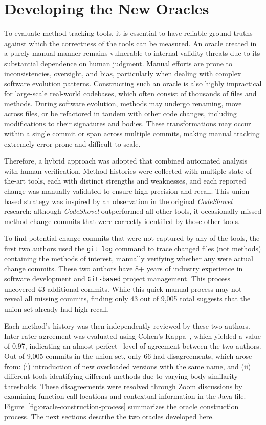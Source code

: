 \section{Developing the New Oracles}
\label{sec:developing-oracles}
To evaluate method-tracking tools, it is essential to have reliable ground truths against which the correctness of the tools can be measured. An oracle created in a purely manual manner remains vulnerable to internal validity threats due to its substantial dependence on human judgment. Manual efforts are prone to inconsistencies, oversight, and bias, particularly when dealing with complex software evolution patterns. Constructing such an oracle is also highly impractical for large-scale real-world codebases, which often consist of thousands of files and methods. During software evolution, methods may undergo renaming, move across files, or be refactored in tandem with other code changes, including modifications to their signatures and bodies. These transformations may occur within a single commit or span across multiple commits, making manual tracking extremely error-prone and difficult to scale.

Therefore, a hybrid approach was adopted that combined automated analysis with human verification. Method histories were collected with multiple state-of-the-art tools, each with distinct strengths and weaknesses, and each reported change was manually validated to ensure high precision and recall. This union-based strategy was inspired by an observation in the original \textit{CodeShovel} research: although \textit{CodeShovel} outperformed all other tools, it occasionally missed method change commits that were correctly identified by those other tools.

To find potential change commits that were not captured by any of the tools, the first two authors used the \texttt{git log} command to trace changed files (not methods) containing the methods of interest, manually verifying whether any were actual change commits.
These two authors have 8+ years of industry experience in software development and \texttt{Git-based} project management. This process uncovered 43 additional commits. While this quick manual process may not reveal all missing commits, finding only 43 out of 9,005 total suggests that the union set already had high recall.

Each method’s history was then independently reviewed by these two authors. Inter-rater agreement was evaluated using Cohen’s Kappa~\cite{cohen_coefficient_1960}, which yielded a value of 0.97, indicating an almost perfect~\cite{viera2005understanding} level of agreement between the two authors. Out of 9,005 commits in the union set, only 66 had disagreements, which arose from: (i) introduction of new overloaded versions with the same name, and (ii) different tools identifying different methods due to varying body-similarity thresholds. These disagreements were resolved through Zoom discussions by examining function call locations and contextual information in the Java file.
Figure~\ref{fig:oracle-construction-process} summarizes the oracle construction process. The next sections describe the two oracles developed here.

